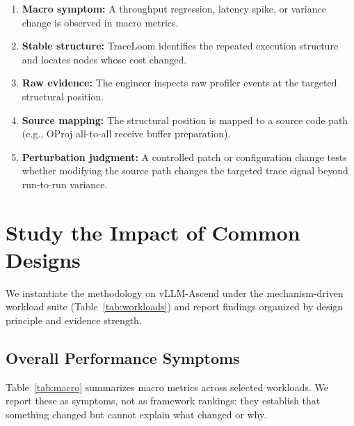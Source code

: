 \documentclass[conference]{IEEEtran}
\begin{document}
\begin{enumerate}
\item \textbf{Macro symptom:} A throughput regression, latency spike, or
variance change is observed in macro metrics.
\item \textbf{Stable structure:} TraceLoom identifies the repeated execution
structure and locates nodes whose cost changed.
\item \textbf{Raw evidence:} The engineer inspects raw profiler events at the
targeted structural position.
\item \textbf{Source mapping:} The structural position is mapped to a source
code path (e.g., OProj all-to-all receive buffer preparation).
\item \textbf{Perturbation judgment:} A controlled patch or configuration
change tests whether modifying the source path changes the targeted trace
signal beyond run-to-run variance.
\end{enumerate}


\section{Study the Impact of Common Designs}
\label{sec:evaluation}

We instantiate the methodology on vLLM-Ascend under the mechanism-driven
workload suite (Table~\ref{tab:workloads}) and report findings organized by
design principle and evidence strength.

\subsection{Overall Performance Symptoms}

Table~\ref{tab:macro} summarizes macro metrics across selected workloads. We
report these as symptoms, not as framework rankings: they establish that
something changed but cannot explain what changed or why.
\end{document}
